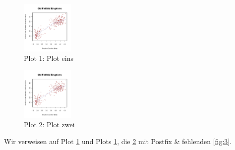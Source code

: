 \begin{figure}
\hypertarget{fig:1}{%
\centering
\includegraphics[width=1in,height=\textheight]{img/fig-1.png}
\caption{Plot 1: Plot eins}\label{fig:1}
}
\end{figure}

\begin{figure}
\hypertarget{fig:2}{%
\centering
\includegraphics[width=1in,height=\textheight]{img/fig-1.png}
\caption{Plot 2: Plot zwei}\label{fig:2}
}
\end{figure}

Wir verweisen auf Plot \ref{fig:1} und Plots \ref{fig:1}, die
\ref{fig:2} mit Postfix \& fehlenden \ref{fig:3}.
